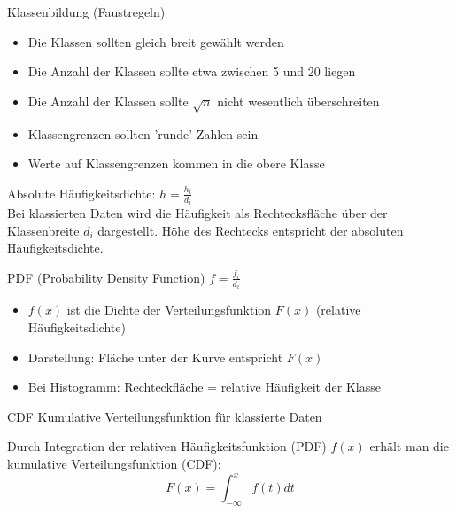 \begin{KR}{Klassenbildung (Faustregeln)}
\begin{itemize}
    \item Die Klassen sollten gleich breit gewählt werden
    \item Die Anzahl der Klassen sollte etwa zwischen 5 und 20 liegen
    \item Die Anzahl der Klassen sollte $\sqrt{n}$ nicht wesentlich überschreiten
    \item Klassengrenzen sollten 'runde' Zahlen sein
    \item Werte auf Klassengrenzen kommen in die obere Klasse
\end{itemize}
\end{KR}



\begin{corollary}{Absolute Häufigkeitsdichte:}
$h = \frac{h_i}{d_i}$\\
Bei klassierten Daten wird die Häufigkeit als Rechtecksfläche über der Klassenbreite $d_i$ dargestellt.
Höhe des Rechtecks entspricht der absoluten Häufigkeitsdichte.
\end{corollary}

\begin{corollary}{PDF (Probability Density Function)} 
    $f = \frac{f_i}{d_i}$
    \begin{itemize}
        \item $f(x)$ ist die Dichte der Verteilungsfunktion $F(x)$ (relative Häufigkeitsdichte)
        \item Darstellung: Fläche unter der Kurve entspricht $F(x)$
        \item Bei Histogramm: Rechteckfläche = relative Häufigkeit der Klasse
    \end{itemize}
\end{corollary}

\begin{corollary}{CDF} Kumulative Verteilungsfunktion für klassierte Daten

Durch Integration der relativen Häufigkeitsfunktion (PDF) $f(x)$ erhält man die kumulative Verteilungsfunktion (CDF):
$$F(x) = \int_{-\infty}^x f(t)dt$$
\end{corollary}


